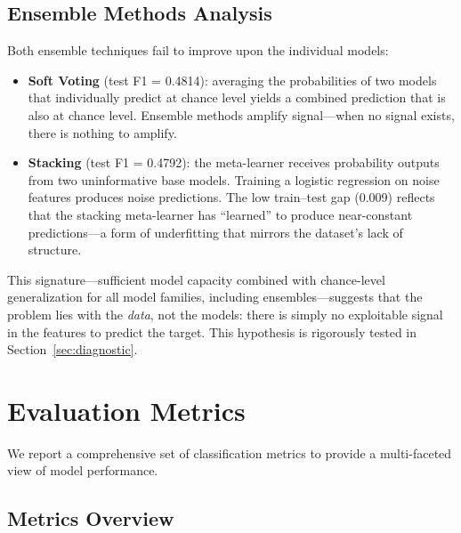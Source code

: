 \documentclass[a4paper,12pt]{article}
\begin{document}
\subsection{Ensemble Methods Analysis}

Both ensemble techniques fail to improve upon the individual models:

\begin{itemize}[leftmargin=2cm]
    \item \textbf{Soft Voting} (test F1 = 0.4814): averaging the probabilities of two models that individually predict at chance level yields a combined prediction that is also at chance level. Ensemble methods amplify signal---when no signal exists, there is nothing to amplify.
    \item \textbf{Stacking} (test F1 = 0.4792): the meta-learner receives probability outputs from two uninformative base models. Training a logistic regression on noise features produces noise predictions. The low train--test gap (0.009) reflects that the stacking meta-learner has ``learned'' to produce near-constant predictions---a form of underfitting that mirrors the dataset's lack of structure.
\end{itemize}

This signature---sufficient model capacity combined with chance-level generalization for all model families, including ensembles---suggests that the problem lies with the \emph{data}, not the models: there is simply no exploitable signal in the features to predict the target. This hypothesis is rigorously tested in Section~\ref{sec:diagnostic}.

\section{Evaluation Metrics}
\label{sec:metrics}

We report a comprehensive set of classification metrics to provide a multi-faceted view of model performance.

\subsection{Metrics Overview}
\end{document}
